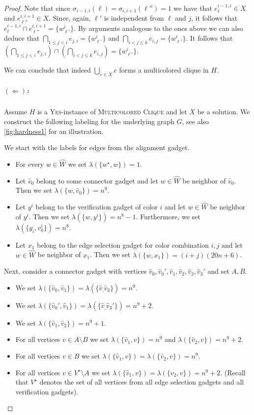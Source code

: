 \documentclass[a4paper,UKenglish,cleveref, autoref, thm-restate, anonymous]{lipics-v2021}
\begin{document}
\begin{proof}
Note that since $\sigma_{i-1,i}(\ell)=\sigma_{i,i+1}(\ell'')=1$ we have that $e^{i-1,i}_\ell\in X$ and $e^{i,i+1}_{\ell''}\in X$.
Since, again, $\ell'$ is independent from $\ell$ and $j$, it follows that $e^{i-1,i}_\ell\cap e^{i,i+1}_{\ell''} =\{w^i_{\ell'}\}$. By arguments analogous to the ones above we can also deduce that $\bigcap_{1\le j<i} e_{j,i}=\{w^i_{\ell'}\}$ and $\bigcap_{i<j\le k} e_{i,j}=\{w^i_{\ell'}\}$. It follows that $(\bigcap_{1\le j<i} e_{j,i}) \cap (\bigcap_{i<j\le k} e_{i,j})=\{w^i_{\ell'}\}$.

We can conclude that indeed $\bigcup_{e\in X}e$ forms a multicolored clique in $H$.

\subparagraph{$(\Leftarrow)$:} Assume $H$ is a \textsc{Yes}-instance of \textsc{Multicolored Clique} and let $X$ be a solution. We construct the following labeling for the underlying graph $G$, see also \cref{fig:hardness1} for an illustration.

We start with the labels for edges from the alignment gadget. 
\begin{itemize}
    \item For every $w\in\hat{W}$ we set $\lambda(\{w^\star,w\})=1$.
    \item Let $\hat{v}_0$ belong to some connector gadget and let $w\in\hat{W}$ be neighbor of $\hat{v}_0$. Then we set $\lambda(\{w,\hat{v}_0\})=n^9$.
    \item Let $y^i$ belong to the verification gadget of color $i$ and let $w\in\hat{W}$ be neighbor of $y^i$. Then we set $\lambda(\{w,y^i\})=n^8-1$. Furthermore, we set $\lambda(\{y_i,v^i_0\})=n^8$.
    \item Let $x_1$ belong to the edge selection gadget for color combination $i,j$ and let $w\in\hat{W}$ be neighbor of $x_1$. Then we set $\lambda(\{w,x_1\})=(i+j)(20n+6)$.
\end{itemize}

Next, consider a connector gadget with vertices $\hat{v}_0,\hat{v}_0',\hat{v}_1,\hat{v}_2,\hat{v}_3,\hat{v}_3'$ and set $A,B$.
\begin{itemize}
    \item We set $\lambda(\{\hat{v}_0,\hat{v}_1\})=\lambda(\{\hat{v}_,\hat{v}_3\})=n^9$.
    \item We set $\lambda(\{\hat{v}_0',\hat{v}_1\})=\lambda(\{\hat{v}_,\hat{v}_3'\})=n^9+2$.
    \item We set $\lambda(\{\hat{v}_1,\hat{v}_2\})=n^9+1$.
    \item For all vertices $v\in A\setminus B$ we set $\lambda(\{\hat{v}_1,v\})=n^9$ and $\lambda(\{\hat{v}_2,v\})=n^9+2$.
    \item For all vertices $v\in B$ we set $\lambda(\{\hat{v}_1,v\})=\lambda(\{\hat{v}_2,v\})=n^9$.
    \item For all vertices $v\in V^\star\setminus A$ we set $\lambda(\{\hat{v}_1,v\})=\lambda(\{\hat{v}_2,v\})=n^9+2$. (Recall that $V^\star$ denotes the set of all vertices from all edge selection gadgets and all verification gadgets).
\end{itemize}



\end{proof}
\end{document}
